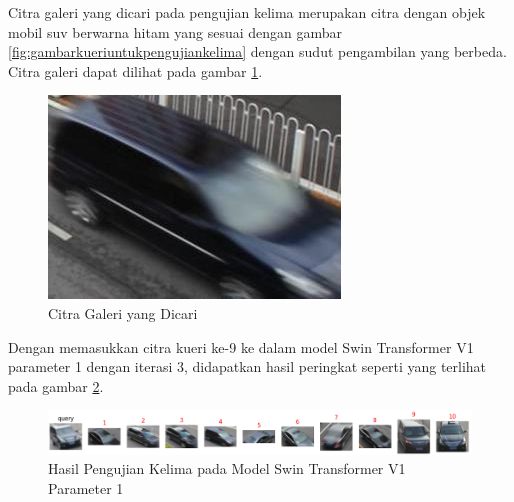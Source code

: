 Citra galeri yang dicari pada pengujian kelima merupakan citra dengan objek \linebreak mobil suv berwarna hitam 
yang sesuai dengan gambar \ref{fig:gambarkueriuntukpengujiankelima} dengan sudut pengambilan yang berbeda. 
Citra galeri dapat dilihat pada gambar \ref{fig:gambargaleriuntukpengujiankelima}.

\begin{figure}[h!]
  \centering
  \includegraphics[scale=0.4]{gambar/Gal9_1019.jpg}
  \caption{Citra Galeri yang Dicari}
  \label{fig:gambargaleriuntukpengujiankelima}
\end{figure}


Dengan memasukkan citra kueri ke-9 ke dalam model Swin Transformer V1 parameter 1 dengan iterasi 3, didapatkan hasil 
peringkat seperti yang terlihat pada gambar \ref{fig:hasilpengujiankelimapadamodelswintransformerv1param1}.

\begin{figure}[h!]
  \centering
  \includegraphics[scale=0.6]{gambar/Que9V1P1IT3.png}
  \caption{Hasil Pengujian Kelima pada Model Swin Transformer V1 Parameter 1}
  \label{fig:hasilpengujiankelimapadamodelswintransformerv1param1}
\end{figure}

